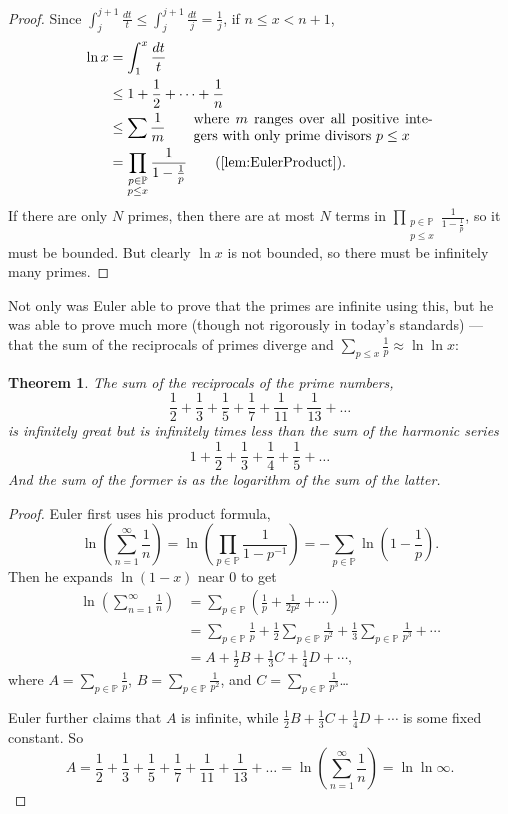 \documentclass[a4paper]{article}
\newtheorem{theorem}{Theorem}[section]
\theoremstyle{definition}
\theoremstyle{remark}
\begin{document}
\begin{proof}
  Since $\int_j^{j+1}\frac{dt}{t}\le\int_j^{j+1}\frac{dt}{j}=\frac{1}{j}$, if $n\le x<n+1$, 
  \begin{align*}
    \ln x&=\int_1^x\frac{dt}{t}\\
    &\le1+\frac{1}{2}+\dots+\frac{1}{n}\\
    &\le\sum\frac{1}{m}\qquad\parbox{6cm}{where $m$ ranges over all positive integers with only prime divisors $p\le x$}\\
    &=\prod\limits_{\substack{p\in\mathbb{P}\\p\le x}}\frac{1}{1-\frac{1}{p}}\qquad\text{(\cref{lem:EulerProduct})}
    .
  \end{align*}
  If there are only $N$ primes, then there are at most $N$ terms in $\displaystyle\prod\limits_{\substack{p\in\mathbb{P}\\p\le x}}\frac{1}{1-\frac{1}{p}}$, so it must be bounded. But clearly $\ln x$ is not bounded, so there must be infinitely many primes.
\end{proof}

Not only was Euler able to prove that the primes are infinite using this, but he was able to prove much more (though not rigorously in today's standards) --- that the sum of the reciprocals of primes diverge and $\sum_{p\le x}\frac{1}{p}\approx\ln\ln x$:

\begin{theorem}
  The sum of the reciprocals of the prime numbers,
  \[
  \frac{1}{2}+\frac{1}{3}+\frac{1}{5}+\frac{1}{7}+\frac{1}{11}+\frac{1}{13}+\dots
  \]
  is infinitely great but is infinitely times less than the sum of the harmonic series
  \[
  1+\frac{1}{2}+\frac{1}{3}+\frac{1}{4}+\frac{1}{5}+\dots
  \]
  And the sum of the former is as the logarithm of the sum of the latter.
  \label{thm:EulerReciprocalOfPrimes}
\end{theorem}
\begin{proof}
  Euler first uses his product formula,
  \[
  \ln\left( \sum_{n=1}^\infty\frac{1}{n} \right)=\ln\left( \prod_{p\in\mathbb{P}}\frac{1}{1-p^{-1}} \right)=-\sum_{p\in\mathbb{P}}\ln\left( 1-\frac{1}{p} \right)
  .
  \]
  Then he expands $\ln(1-x)$ near $0$ to get
  \begin{align*}
    \ln\left( \sum_{n=1}^\infty\frac{1}{n} \right)&=\sum_{p\in\mathbb{P}}\left( \frac{1}{p}+\frac{1}{2p^2}+\cdots \right)\\
    &=\sum_{p\in\mathbb{P}}\frac{1}{p}+\frac{1}{2}\sum_{p\in\mathbb{P}}\frac{1}{p^2}+\frac{1}{3}\sum_{p\in\mathbb{P}}\frac{1}{p^3}+\cdots\\
    &=A+\frac{1}{2}B+\frac{1}{3}C+\frac{1}{4}D+\cdots
    ,
  \end{align*}
  where $\displaystyle A=\sum_{p\in\mathbb{P}}\frac{1}{p}$, $\displaystyle B=\sum_{p\in\mathbb{P}}\frac{1}{p^2}$, and $\displaystyle C=\sum_{p\in\mathbb{P}}\frac{1}{p^3}$\dots

  Euler further claims that $A$ is infinite, while $\frac{1}{2}B+\frac{1}{3}C+\frac{1}{4}D+\cdots$ is some fixed constant. So 
  \[
  A=\frac{1}{2}+\frac{1}{3}+\frac{1}{5}+\frac{1}{7}+\frac{1}{11}+\frac{1}{13}+\dots=\ln \left( \sum_{n=1}^\infty\frac{1}{n} \right) = \ln\ln\infty
  .
  \]
\end{proof}
\end{document}
